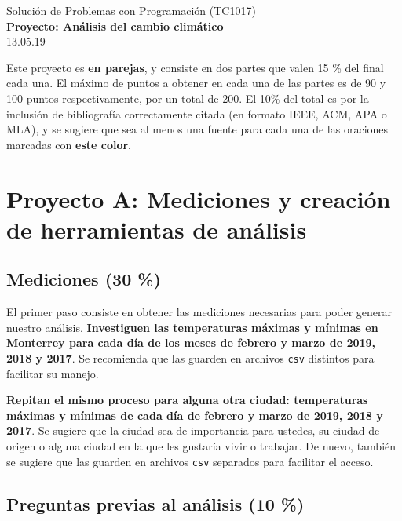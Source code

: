 \documentclass[]{article}
\theoremstyle{definition}
\newcommand{\markthis}[1]{{\color{blue}\textbf{#1}}}
\begin{document}
\begin{center}
{\huge Solución de Problemas con Programación (TC1017)}\\[1.5ex]
{\large \textbf{Proyecto: Análisis del cambio climático}\\[1.5ex] %
13.05.19} %
\end{center}

\vspace{0.2 cm}

{%
\small
Este proyecto es \textbf{en parejas}, y consiste en dos partes que valen 15 \% del final cada una.
El máximo de puntos a obtener en cada una de las partes es de 90 y 100 puntos respectivamente, por un total de 200.
El 10\% del total es por la inclusión de bibliografía correctamente citada (en formato IEEE, ACM, APA o MLA), y se sugiere que sea al menos una fuente para cada una de las oraciones marcadas con \markthis{este color}.
}

\section{Proyecto A: Mediciones y creación de herramientas de análisis}

\subsection{Mediciones (30 \%)}

El primer paso consiste en obtener las mediciones necesarias para poder generar nuestro análisis.
\markthis{Investiguen las temperaturas {\large máximas y mínimas} en Monterrey para cada día de los meses de febrero y marzo de 2019, 2018 y 2017}.
Se recomienda que las guarden en archivos \texttt{csv} distintos para facilitar su manejo.

\bigskip

\markthis{Repitan el mismo proceso para alguna otra ciudad: temperaturas máximas y mínimas de cada día de febrero y marzo de 2019, 2018 y 2017}.
Se sugiere que la ciudad sea de importancia para ustedes, su ciudad de origen o alguna ciudad en la que les gustaría vivir o trabajar.
De nuevo, también se sugiere que las guarden en archivos \texttt{csv} separados para facilitar el acceso.

\subsection{Preguntas previas al análisis (10 \%)}
\end{document}
